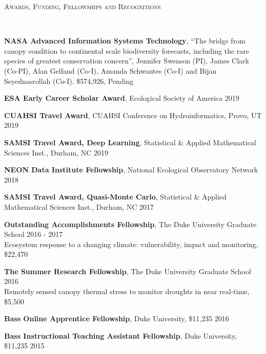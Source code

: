\documentclass[10pt]{article}
\newenvironment{changemargin}[2]{%
  \begin{list}{}{%
 \setlength{\topsep}{0pt}%
 \setlength{\leftmargin}{#1}%
 \setlength{\rightmargin}{#2}%
 \setlength{\listparindent}{\parindent}%
 \setlength{\itemindent}{\parindent}%
 \setlength{\parsep}{\parskip}%
  }%
  \item[]}{\end{list}
}
\newcommand{\lineover}{
  \begin{changemargin}{-0.05in}{-0.05in}
  \vspace*{-8pt}
  \hrulefill \\
  \vspace*{-2pt}
  \end{changemargin}
}
\newcommand{\header}[1]{
  \begin{changemargin}{-0.5in}{-0.5in}
  \scshape{#1}\\
  \lineover
  \end{changemargin}
}
\newenvironment{body} {
  \vspace*{-2pt}
  \begin{changemargin}{-0.5in}{-0.5in}
}
{\end{changemargin}
}
\begin{document}
\header{Awards, Funding, Fellowships and Recognitions}

\begin{body}
 \textbf{NASA Advanced Information Systems Technology}, ``The bridge from canopy condition to continental scale biodiversity forecasts, including the rare species of greatest conservation concern'', Jennifer Swenson (PI), James Clark (Co-PI), Alan Gelfand (Co-I), Amanda Schwantes (Co-I) and Bijan Seyednasrollah (Co-I). \hfill{\$574,926, Pending}\\
  \medskip
  
  \textbf{ESA Early Career Scholar Award}, Ecological Society of America \hfill {2019}\\
  \medskip

  \textbf{CUAHSI Travel Award}, CUAHSI Conference on Hydroinformatics, Provo, UT \hfill {2019}\\
  \medskip


  \textbf{SAMSI Travel Award, Deep Learning}, Statistical \& Applied Mathematical Sciences Inst., Durham, NC \hfill {2019}\\
  \medskip

  \textbf{NEON Data Institute Fellowship}, National Ecological Observatory Network  \hfill {2018}\\
  \medskip

  \textbf{SAMSI Travel Award, Quasi-Monte Carlo}, Statistical \& Applied Mathematical Sciences Inst., Durham, NC \hfill {2017}\\
  \medskip

  \textbf{Outstanding Accomplishments Fellowship}, The Duke University Graduate School \hfill {2016 - 2017}\\
  Ecosystem response to a changing climate: vulnerability, impact and monitoring, \$22,470 \\
  \medskip

  \textbf{The Summer Research Fellowship}, The Duke University Graduate School \hfill {2016}\\
  Remotely sensed canopy thermal stress to monitor droughts in near real-time, \$5,500 \\
  \medskip

  \textbf{Bass Online Apprentice Fellowship}, Duke University, \$11,235 \hfill {2016}\\
  \medskip

  \textbf{Bass Instructional Teaching Assistant Fellowship}, Duke University, \$11,235 \hfill {2015}\\
  \medskip


\end{body}
\end{document}

